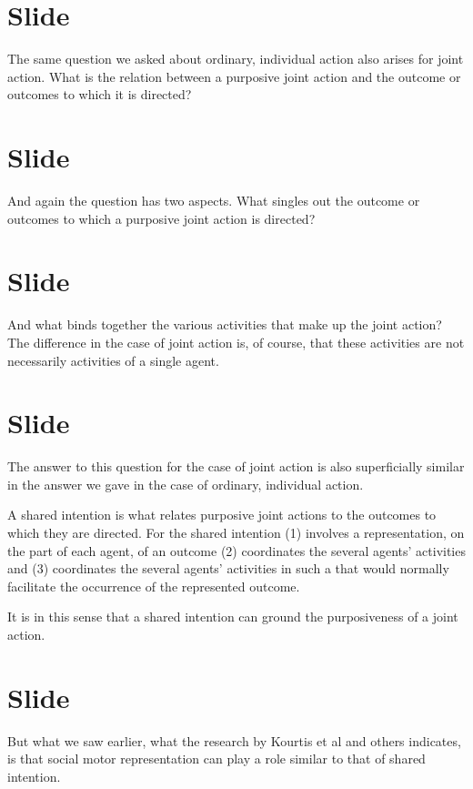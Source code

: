 \documentclass[12pt,\papersize]{extarticle}
\begin{document}
\section{Slide}
The same question we asked about ordinary, individual action also arises for joint action.
What is the relation between a purposive joint action and the outcome or outcomes to which it is directed?




\section{Slide}
And again the question has two aspects.
What singles out the outcome or outcomes to which a purposive joint action is directed?



\section{Slide}
And what binds together the various activities that make up the joint action?
The difference in the case of joint action is, of course, that these activities are not necessarily activities of a single agent.




\section{Slide}
The answer to this question for the case of joint action is also superficially similar in the answer we gave in the case of ordinary, individual action.

A shared intention is what relates purposive joint actions to the outcomes to which they are directed.
For the shared intention
(1) involves a representation, on the part of each agent, of an outcome
(2) coordinates the several agents’ activities
and 
(3) coordinates the several agents’ activities in such a that would normally facilitate the occurrence of the represented outcome.

It is in this sense that a shared intention can ground the purposiveness of a joint action.




\section{Slide}
But what we saw earlier, what the research by Kourtis et al and others indicates, is that social motor representation can play a  role similar to that of shared intention.
\end{document}

